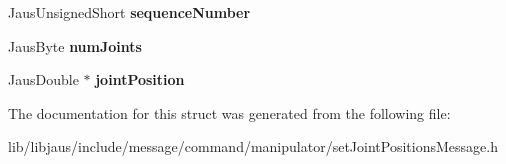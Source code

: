 \begin{DoxyCompactItemize}
\item 
\hypertarget{struct_set_joint_positions_message_struct_a4eca5b41246f5b6a0dc53d283555e88e}{\-Jaus\-Unsigned\-Short {\bfseries sequence\-Number}}\label{struct_set_joint_positions_message_struct_a4eca5b41246f5b6a0dc53d283555e88e}

\item 
\hypertarget{struct_set_joint_positions_message_struct_a3e9c4e04a492b12ae29633a9a64100f3}{\-Jaus\-Byte {\bfseries num\-Joints}}\label{struct_set_joint_positions_message_struct_a3e9c4e04a492b12ae29633a9a64100f3}

\item 
\hypertarget{struct_set_joint_positions_message_struct_abf8763690b6001ca689a4b77ef1f8ee5}{\-Jaus\-Double $\ast$ {\bfseries joint\-Position}}\label{struct_set_joint_positions_message_struct_abf8763690b6001ca689a4b77ef1f8ee5}

\end{DoxyCompactItemize}


\-The documentation for this struct was generated from the following file\-:\begin{DoxyCompactItemize}
\item 
lib/libjaus/include/message/command/manipulator/set\-Joint\-Positions\-Message.\-h\end{DoxyCompactItemize}
